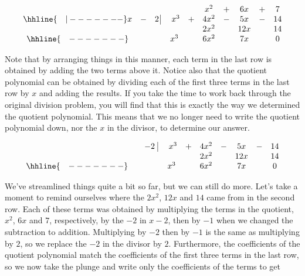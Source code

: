 \[ \begin{array}{cccccccccc}
& & & & & x^2 & + & 6x & + & 7 \\ \hhline{~~~|-------}
x & - & 2 \, \vline& \, \, x^3 & + & 4x^2 & - & 5x & - & 14 \\
 &  &  &   & &   2x^2 &  & 12x &  & 14 \\ \hhline{~~~-------} 
 &  &  & x^3  &  & 6 x^2 &  & 7x &  &0  \\  
\end{array}\]

\setlength\arraycolsep{5pt}
\setlength\extrarowheight{0pt}

Note that by arranging things in this manner, each term in the last row is obtained by adding the two terms above it.  Notice also that the quotient polynomial can be obtained by dividing each of the first three terms in the last row by $x$ and adding the results.   If you take the time to work back through the original division problem, you will find that this is exactly the way we determined the quotient polynomial.  This means that we no longer need to write the quotient polynomial down, nor the $x$ in the divisor, to determine our answer.

\setlength\arraycolsep{0.1pt}
\setlength\extrarowheight{2pt}

\[ \begin{array}{cccccccccc}
 & & - 2 \, \, \vline& \, \, x^3 & + & 4x^2 & - & 5x & - & 14 \\
 &  &  &   & &   2x^2 &  & 12x &  & 14 \\ \hhline{~~~-------} 
 &  &  & x^3  &  & 6 x^2 &  & 7x &  &0  \\  
\end{array}\]

\setlength\arraycolsep{5pt}
\setlength\extrarowheight{0pt}

We've streamlined things quite a bit so far, but we can still do more.  Let's take a moment to remind ourselves where the $2x^2$, $12x$ and $14$ came from in the second row.  Each of these terms was obtained by multiplying the terms in the quotient, $x^2$, $6x$ and $7$, respectively, by the $-2$ in $x-2$,  then by $-1$ when we changed the subtraction to addition.  Multiplying by $-2$ then by $-1$ is the same as multiplying by $2$, so we replace the $-2$ in the divisor by $2$.   Furthermore, the coefficients of the quotient polynomial match the coefficients of the first three terms in the last row, so we now take the plunge and write only the coefficients of the terms to get



